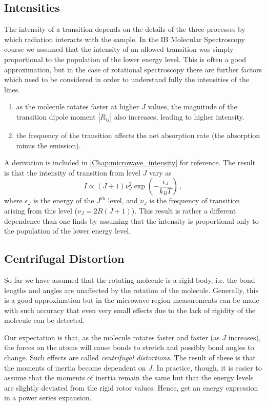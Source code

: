 \documentclass{article}
\theoremstyle{plain}\theoremheaderfont{\normalfont\itshape}\theorembodyfont{\rmfamily}\theoremseparator{.}\newtheorem*{rem}{Remark}\newtheorem*{ex}{Example}\newtheorem*{proof}{Proof}\newtheorem*{altp}{Alternative proof}
\theoremstyle{plain}\theoremheaderfont{\normalfont\bfseries}\theorembodyfont{\rmfamily}\theoremseparator{.}\newtheorem{thm}{Theorem}[section]\newtheorem{lem}[thm]{Lemma}\newtheorem{prop}[thm]{Proposition}\newtheorem*{cor}{Corollary}\newtheorem{defn}[thm]{Definition}\newtheorem{clm}[thm]{Claim}\newtheorem{clminproof}{Claim}\newtheorem{pos}{Postulate}[section]
\theoremstyle{break}\theoremheaderfont{\normalfont\itshape}\theorembodyfont{\rmfamily}\theoremseparator{.\medskip}\newtheorem*{proofskip}{Proof}\newtheorem*{exs}{Examples}\newtheorem*{rems}{Remarks}
\theoremstyle{break}\theoremheaderfont{\normalfont\bfseries}\theorembodyfont{\rmfamily}\theoremseparator{.\medskip}\newtheorem{lemskip}[thm]{Lemma}\newtheorem{defnskip}[thm]{Definition}\newtheorem{propskip}[thm]{Proposition}\newtheorem{thmskip}[thm]{Theorem}
\numberwithin{equation}{section}
\newcommand{\abs}[1]{\left| #1 \right|}
\begin{document}
    \subsection{Intensities}
    The intensity of a transition depends on the details of the three processes by which radiation interacts with the sample. In the IB Molecular Spectroscopy course we assumed that the intensity of an allowed transition was simply proportional to the population of the lower energy level. This is often a good approximation, but in the case of rotational spectroscopy there are further factors which need to be considered in order to understand fully the intensities of the lines.
    \begin{enumerate}[topsep=0pt,label=(\roman*)]
        \item as the molecule rotates faster at higher \(J\) values, the magnitude of the transition dipole moment \(\abs{R_{ij}}\) also increases, leading to higher intensity.
        \item the frequency of the transition affects the net absorption rate (the absorption minus the emission).
    \end{enumerate}

    A derivation is included in \cref{Chap:microwave_intensity} for reference. The result is that the intensity of transition from level \(J\) vary as
    \begin{equation}
        I\propto(J+1)\nu_J^2\exp\left(-\frac{\epsilon_J}{k_B T}\right)\,,
    \end{equation}
    where \(\epsilon_J\) is the energy of the \(J^{\text{th}}\) level, and \(\nu_J\) is the frequency of transition arising from this level (\(\nu_J=2B(J+1)\)). This result is rather a different dependence than one finds by assuming that the intensity is proportional only to the population of the lower energy level.

    \subsection{Centrifugal Distortion}
    So far we have assumed that the rotating molecule is a rigid body, i.e. the bond lengths and angles are unaffected by the rotation of the molecule. Generally, this is a good approximation but in the microwave region measurements can be made with such accuracy that even very small effects due to the lack of rigidity of the molecule can be detected.

    Our expectation is that, as the molecule rotates faster and faster (as \(J\) increases), the forces on the atoms will cause bonds to stretch and possibly bond angles to change. Such effects are called \textit{centrifugal distortions}. The result of these is that the moments of inertia become dependent on \(J\). In practice, though, it is easier to assume that the moments of inertia remain the same but that the energy levels are slightly deviated from the rigid rotor values. Hence, get an energy expression in a power series expansion.
\end{document}
